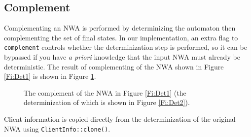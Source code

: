 


\subsection{Complement}
\label{Se:Complement}

Complementing an NWA is performed by determinizing the automaton then
complementing the set of final states. In our implementation, an extra flag
to \texttt{complement} controls whether the determinization step is
performed, so it can be bypassed if you have \textsl{a priori} knowledge that
the input NWA must already be deterministic. The result of
complementing of the NWA shown in Figure \ref{Fi:Det1} is
shown in Figure \ref{Fi:Comp1}.

\begin{figure}[p]
  \centering
  \caption{The complement of the NWA in Figure \ref{Fi:Det1} (the
    determinization of which is shown in Figure \ref{Fi:Det2}).}
  \label{Fi:Comp1}
\end{figure}

Client information is copied directly
from the determinization of the original NWA using \texttt{ClientInfo::clone()}.


